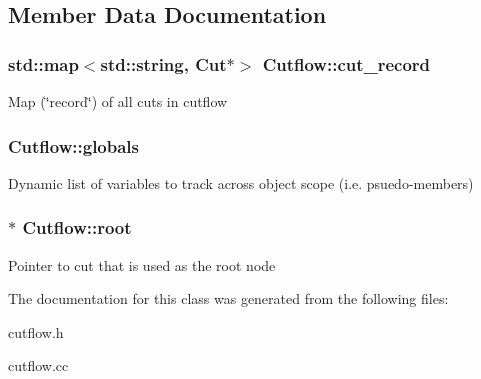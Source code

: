 \subsection{Member Data Documentation}
\subsubsection[{\texorpdfstring{cut\+\_\+record}{cut_record}}]{\setlength{\rightskip}{0pt plus 5cm}std\+::map$<$std\+::string, {\bf Cut}$\ast$$>$ Cutflow\+::cut\+\_\+record\hspace{0.3cm}{\ttfamily [protected]}}\hypertarget{classCutflow_a76f5cbd82750844d379384c7b1243cca}{}\label{classCutflow_a76f5cbd82750844d379384c7b1243cca}
Map (\char`\"{}record\char`\"{}) of all cuts in cutflow 
\subsubsection[{\texorpdfstring{globals}{globals}}]{ Cutflow\+::globals}\hypertarget{classCutflow_a71390324488ac6ed4a72c41f4a2c1c10}{}\label{classCutflow_a71390324488ac6ed4a72c41f4a2c1c10}
Dynamic list of variables to track across object scope (i.\+e. psuedo-\/members) 
\subsubsection[{\texorpdfstring{root}{root}}]{$\ast$ Cutflow\+::root\hspace{0.3cm}{\ttfamily [protected]}}\hypertarget{classCutflow_a96f2343bfae77c94f2e87b5f3a128d6d}{}\label{classCutflow_a96f2343bfae77c94f2e87b5f3a128d6d}
Pointer to cut that is used as the root node 

The documentation for this class was generated from the following files\+:\begin{DoxyCompactItemize}
\item 
cutflow.\+h\item 
cutflow.\+cc\end{DoxyCompactItemize}
